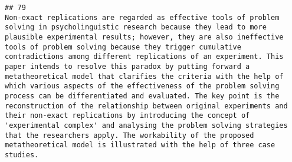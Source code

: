 \documentclass[
  english,
  man]{apa6}
\begin{document}
\begin{verbatim}
## 79                                                                                                                                                                                                                                                                                                                                                                                                                                                                                                                                                                                                                                                                                                                                                                                                                                                                                                                                                                                                                                                                                                                                                                                                                                                                                                                                                                                                                                                                                                                                                                                                                                                                                                                                Non-exact replications are regarded as effective tools of problem solving in psycholinguistic research because they lead to more plausible experimental results; however, they are also ineffective tools of problem solving because they trigger cumulative contradictions among different replications of an experiment. This paper intends to resolve this paradox by putting forward a metatheoretical model that clarifies the criteria with the help of which various aspects of the effectiveness of the problem solving process can be differentiated and evaluated. The key point is the reconstruction of the relationship between original experiments and their non-exact replications by introducing the concept of 'experimental complex' and analysing the problem solving strategies that the researchers apply. The workability of the proposed metatheoretical model is illustrated with the help of three case studies.

\end{verbatim}
\end{document}
